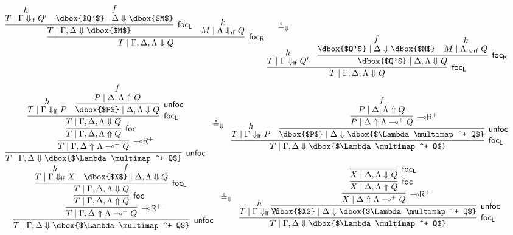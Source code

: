 \documentclass[runningheads]{llncs}
\newcommand{\lright}{{\multimap}\mathsf{R}}
\newcommand{\lolliR}{\lright}
\newcommand{\lolli}{\multimap}
\newcommand{\lf}{\dn_\mathsf{lf}}%
\newcommand{\rf}{\dn_\mathsf{rf}}%
\newcommand{\proofbox}[1]{\begin{tabular}{l} #1 \end{tabular}}
\newcommand{\up}{\Uparrow}
\newcommand{\dn}{\Downarrow}
\newcommand{\focL}{\mathsf{foc_L}}
\newcommand{\foc}{\mathsf{foc}}
\newcommand{\focR}{\mathsf{foc_R}}
\newcommand{\unfoc}{\mathsf{unfoc}}
\begin{document}
\begin{figure}[hbpt]
\scriptsize 
\[
\begin{array}{rcl}
\proofbox{
  \infer[\focR]{T \mid \Gamma,\Delta,\Lambda \dn Q}{    
    \infer[\focL]{T \mid \Gamma,\Delta \dn \dbox{$M$}}{
      \deduce{T \mid \Gamma \lf Q'}{h} &
      \deduce{\dbox{$Q'$} \mid \Delta \dn \dbox{$M$}}{f}      
    }
    &
    \deduce{M \mid \Lambda \rf Q}{k}
  }
}   & \circeq_\dn 
\\[-15pt] &&
\hspace{-42pt}
\proofbox{
\infer[\focL]{T \mid \Gamma,\Delta,\Lambda \dn Q}{
    \deduce{T \mid \Gamma \lf Q'}{h} &
    \infer[\focR]{\dbox{$Q'$} \mid \Delta,\Lambda \dn Q}{
      \deduce{\dbox{$Q'$} \mid \Delta \dn \dbox{$M$}}{f} &
      \deduce{M \mid \Lambda \rf Q}{k}
    }
  }
}
\end{array}
\]
\[
\begin{array}{c}
\proofbox{
  \infer[\unfoc]{T \mid \Gamma,\Delta \dn \dbox{$\Lambda \lolli^+ Q$}}{
    \infer[\lolliR^+]{T \mid \Gamma,\Delta \up \Lambda \lolli^+ Q}{
      \infer[\foc]{T \mid \Gamma,\Delta,\Lambda \up Q}{
        \infer[\focL]{T \mid \Gamma , \Delta,\Lambda \dn Q}{
          \deduce{T \mid \Gamma \lf P}{h} &
          \infer[\unfoc]{\dbox{$P$} \mid \Delta,\Lambda \dn Q}{
            \deduce{P \mid \Delta,\Lambda \up Q}{f}
          }
        }
      }
    }
  }
} \circeq_\dn 
\proofbox{
  \infer[\focL]{T \mid \Gamma,\Delta \dn \dbox{$\Lambda \lolli^+ Q$}}{
    \deduce{T \mid \Gamma \lf P}{h} &
    \infer[\unfoc]{\dbox{$P$} \mid \Delta \dn \dbox{$\Lambda \lolli^+ Q$}}{
      \infer[\lolliR^+]{P \mid \Delta \up \Lambda \lolli^+ Q}{
        \deduce{P \mid \Delta,\Lambda \up Q}{f}
      }
    }
  }
}
\\[6pt]
\proofbox{
  \infer[\unfoc]{T \mid \Gamma,\Delta \dn \dbox{$\Lambda \lolli^+ Q$}}{
    \infer[\lolliR^+]{T \mid \Gamma,\Delta \up \Lambda \lolli^+ Q}{
      \infer[\foc]{T \mid \Gamma,\Delta,\Lambda \up Q}{
        \infer[\focL]{T \mid \Gamma , \Delta,\Lambda \dn Q}{
          \deduce{T \mid \Gamma \lf X}{h} &
          \deduce{\dbox{$X$} \mid \Delta,\Lambda \dn Q}{f}
        }
      }
    }
  }
}  \circeq_\dn 
\proofbox{
  \infer[\focL]{T \mid \Gamma,\Delta \dn \dbox{$\Lambda \lolli^+ Q$}}{
    \deduce{T \mid \Gamma \lf X}{h} &
    \hspace{-20pt}
    \infer[\unfoc]{\dbox{$X$} \mid \Delta \dn \dbox{$\Lambda \lolli^+ Q$}}{
      \infer[\lolliR^+]{X \mid \Delta \up \Lambda \lolli^+ Q}{
        \infer[\foc]{X \mid \Delta,\Lambda \up Q}{
          \infer[\focL]{X \mid \Delta,\Lambda \dn Q}{
}}}}}}
\end{array}\]
\end{figure}
\end{document}
